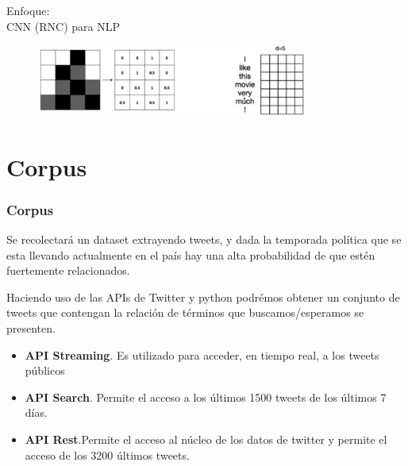 \documentclass{beamer}
\begin{document}
\begin{frame}
    Enfoque:\\
    \centering
        CNN (RNC) para NLP 
        \vspace{0.5cm}
        \begin{figure}
            \includegraphics[width=0.8\textwidth]{img/rpyWSSZN22.png}
        \end{figure}
\end{frame}



\section{Corpus}
\begin{frame}
    \frametitle{Corpus}
    Se recolectará un dataset extrayendo tweets, y dada la temporada política que se esta llevando actualmente en el país hay una alta probabilidad de que estén fuertemente relacionados.

    \vspace{0.5cm} \pause

    Haciendo uso de las APIs \cite{api-tweet} de Twitter y python podrémos obtener un conjunto de tweets que contengan la relación de términos que buscamos/esperamos se presenten.


\end{frame}

\begin{frame}    
    \begin{itemize}
        \item \textbf{API Streaming}. Es utilizado para acceder, en tiempo real, a los tweets públicos
        \item \textbf{API Search}. Permite el acceso a los últimos 1500 tweets de los últimos 7 días.
        \item \textbf{API Rest}.Permite el acceso al núcleo de los datos de twitter y permite el acceso de los 3200 últimos tweets.
    \end{itemize}
\end{frame}
\end{document}

